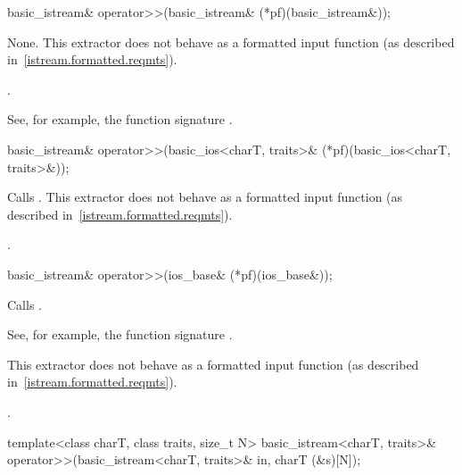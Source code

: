 %
\begin{itemdecl}
basic_istream& operator>>(basic_istream& (*pf)(basic_istream&));
\end{itemdecl}

\begin{itemdescr}
\pnum
\effects
None.
This extractor does not behave as a formatted input function
(as described in~\ref{istream.formatted.reqmts}).

\pnum
\returns
{}.%
%
\begin{footnote}
See, for example, the function signature
.
\end{footnote}
\end{itemdescr}

%
\begin{itemdecl}
basic_istream& operator>>(basic_ios<charT, traits>& (*pf)(basic_ios<charT, traits>&));
\end{itemdecl}

\begin{itemdescr}
\pnum
\effects
Calls
.
This extractor does not behave as a formatted input function
(as described in~\ref{istream.formatted.reqmts}).

\pnum
\returns
{}.
\end{itemdescr}

%
\begin{itemdecl}
basic_istream& operator>>(ios_base& (*pf)(ios_base&));
\end{itemdecl}

\begin{itemdescr}
\pnum
\effects
Calls
.
\begin{footnote}
See, for example, the function signature
.
\end{footnote}
This extractor does not behave as a formatted input function
(as described in~\ref{istream.formatted.reqmts}).

\pnum
\returns
{}.
\end{itemdescr}

%
\begin{itemdecl}
template<class charT, class traits, size_t N>
  basic_istream<charT, traits>& operator>>(basic_istream<charT, traits>& in, charT (&s)[N]);
\end{itemdecl}

